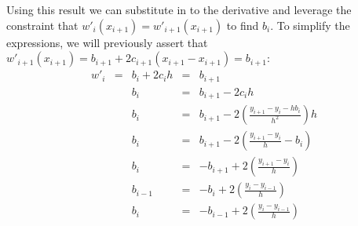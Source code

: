\documentclass[11pt,a4paper]{article}
\begin{document}
\begin{itemize}
\begin{enumerate} [label={\alph*)}]
					Using this result we can substitute in to the derivative and leverage the constraint that $w'_{i}(x_{i+1}) = w'_{i+1}(x_{i+1})$ to find $b_i$. To simplify the expressions, we will previously assert that $w'_{i+1}(x_{i+1})=b_{i+1}+2c_{i+1}(x_{i+1}-x_{i+1})=b_{i+1}$:
					$$\begin{array}{ccccc}
						w'_i &=& b_i+2c_ih &=& b_{i+1}\\
						&&b_i&=& b_{i+1}-2c_ih \\
						&&b_i&=& b_{i+1}-2(\frac{y_{i+1}-y_i-hb_i}{h^2})h\\
						&&b_i&=& b_{i+1}-2(\frac{y_{i+1}-y_i}{h} - b_i) \\
						&&b_i&=& -b_{i+1}+2(\frac{y_{i+1}-y_i}{h}) \\
						&&b_{i-1}&=& -b_{i}+2(\frac{y_{i}-y_{i-1}}{h}) \\
						&&b_{i}&=& -b_{i-1}+2(\frac{y_{i}-y_{i-1}}{h})
					\end{array}$$
					

\end{enumerate}
\end{itemize}
\end{document}
